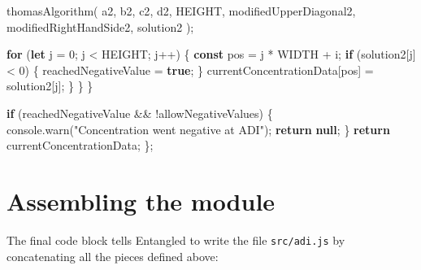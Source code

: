 \documentclass[
  letterpaper,
  DIV=11,
  numbers=noendperiod]{scrreprt}
\newenvironment{Shaded}{\begin{snugshade}}{\end{snugshade}}
\newcommand{\BuiltInTok}[1]{\textcolor[rgb]{0.00,0.23,0.31}{#1}}
\newcommand{\ControlFlowTok}[1]{\textcolor[rgb]{0.00,0.23,0.31}{\textbf{#1}}}
\newcommand{\DecValTok}[1]{\textcolor[rgb]{0.68,0.00,0.00}{#1}}
\newcommand{\FunctionTok}[1]{\textcolor[rgb]{0.28,0.35,0.67}{#1}}
\newcommand{\KeywordTok}[1]{\textcolor[rgb]{0.00,0.23,0.31}{\textbf{#1}}}
\newcommand{\NormalTok}[1]{\textcolor[rgb]{0.00,0.23,0.31}{#1}}
\newcommand{\OperatorTok}[1]{\textcolor[rgb]{0.37,0.37,0.37}{#1}}
\newcommand{\StringTok}[1]{\textcolor[rgb]{0.13,0.47,0.30}{#1}}
\begin{document}
\begin{Shaded}
\begin{Highlighting}[]
            \FunctionTok{thomasAlgorithm}\NormalTok{(}
\NormalTok{                a2}\OperatorTok{,}
\NormalTok{                b2}\OperatorTok{,}
\NormalTok{                c2}\OperatorTok{,}
\NormalTok{                d2}\OperatorTok{,}
\NormalTok{                HEIGHT}\OperatorTok{,}
\NormalTok{                modifiedUpperDiagonal2}\OperatorTok{,}
\NormalTok{                modifiedRightHandSide2}\OperatorTok{,}
\NormalTok{                solution2}
\NormalTok{            )}\OperatorTok{;}

            \ControlFlowTok{for}\NormalTok{ (}\KeywordTok{let}\NormalTok{ j }\OperatorTok{=} \DecValTok{0}\OperatorTok{;}\NormalTok{ j }\OperatorTok{\textless{}}\NormalTok{ HEIGHT}\OperatorTok{;}\NormalTok{ j}\OperatorTok{++}\NormalTok{) \{}
                \KeywordTok{const}\NormalTok{ pos }\OperatorTok{=}\NormalTok{ j }\OperatorTok{*}\NormalTok{ WIDTH }\OperatorTok{+}\NormalTok{ i}\OperatorTok{;}
                \ControlFlowTok{if}\NormalTok{ (solution2[j] }\OperatorTok{\textless{}} \DecValTok{0}\NormalTok{) \{}
\NormalTok{                    reachedNegativeValue }\OperatorTok{=} \KeywordTok{true}\OperatorTok{;}
\NormalTok{                \}}
\NormalTok{                currentConcentrationData[pos] }\OperatorTok{=}\NormalTok{ solution2[j]}\OperatorTok{;}
\NormalTok{            \}}
\NormalTok{        \}}
\NormalTok{    \}}

    \ControlFlowTok{if}\NormalTok{ (reachedNegativeValue }\OperatorTok{\&\&} \OperatorTok{!}\NormalTok{allowNegativeValues) \{}
        \BuiltInTok{console}\OperatorTok{.}\FunctionTok{warn}\NormalTok{(}\StringTok{"Concentration went negative at ADI"}\NormalTok{)}\OperatorTok{;}
        \ControlFlowTok{return} \KeywordTok{null}\OperatorTok{;}
\NormalTok{    \}}
    \ControlFlowTok{return}\NormalTok{ currentConcentrationData}\OperatorTok{;}
\NormalTok{\}}\OperatorTok{;}
\end{Highlighting}
\end{Shaded}

\section{Assembling the module}\label{assembling-the-module}

The final code block tells Entangled to write the file
\texttt{src/adi.js} by concatenating all the pieces defined above:
\end{document}
